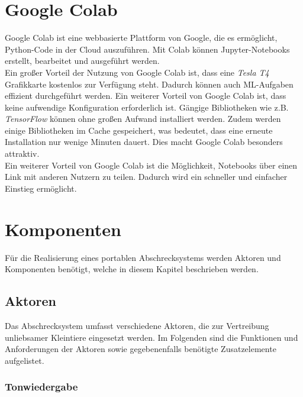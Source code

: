 
\section{Google Colab}

Google Colab ist eine webbasierte Plattform von Google, die es ermöglicht, Python-Code in der Cloud auszuführen. Mit Colab können Jupyter-Notebooks erstellt, bearbeitet und ausgeführt werden.
\\
Ein großer Vorteil der Nutzung von Google Colab ist, dass eine \textit{Tesla T4} Grafikkarte kostenlos zur Verfügung steht. Dadurch können auch \ac{ML}-Aufgaben effizient durchgeführt werden. Ein weiterer Vorteil von Google Colab ist, dass keine aufwendige Konfiguration erforderlich ist. Gängige Bibliotheken wie z.B. \textit{TensorFlow} können ohne großen Aufwand installiert werden. Zudem werden einige Bibliotheken im Cache gespeichert, was bedeutet, dass eine erneute Installation nur wenige Minuten dauert. Dies macht Google Colab besonders attraktiv.
\\
Ein weiterer Vorteil von Google Colab ist die Möglichkeit, Notebooks über einen Link mit anderen Nutzern zu teilen. Dadurch wird ein schneller und einfacher Einstieg ermöglicht.
\cite{colab}

\section{Komponenten}

Für die Realisierung eines portablen Abschrecksystems werden Aktoren und Komponenten benötigt, welche in diesem Kapitel beschrieben werden.

\subsection{Aktoren}

Das Abschrecksystem umfasst verschiedene Aktoren, die zur Vertreibung unliebsamer Kleintiere eingesetzt werden. Im Folgenden sind die Funktionen und Anforderungen der Aktoren sowie gegebenenfalls benötigte Zusatzelemente aufgelistet.

\subsubsection{Tonwiedergabe}

